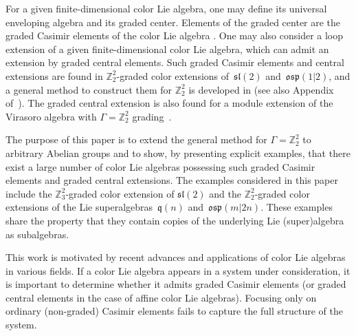 \documentclass[pdftex]{sigma}
\numberwithin{equation}{section}
\theoremstyle{definition}
\def\Z2{\mathbb{Z}_2^2}
\def\osp{\mathfrak{osp}}
\def\sl{\mathfrak{sl}}
\def\q{\mathfrak{q}}
\begin{document}
For a given finite-dimensional color Lie algebra, one may define its universal enveloping algebra and its graded center.
Elements of the graded center are the graded Casimir elements of the color Lie algebra \cite{GrJav, scheu,scheuCasi,scheuTen}.
One may also consider a loop extension of a given finite-dimensional color Lie algebra, which can admit an extension by graded central elements.
Such graded Casimir elements and central extensions are found in $\Z2$-graded color extensions of~$\sl(2)$ and~$\osp(1|2)$, and a general method to construct them for $\Z2$ is developed in \cite{AFITTsuper, AIKTTslint} (see also Appendix of~\cite{AiKimura}).
The graded central extension is also found for a module extension of the Virasoro algebra with $\Gamma = \Z2$ grading~\cite{AizawaConfType}.

The purpose of this paper is to extend the general method for $\Gamma = \Z2$ to arbitrary Abelian groups and to show, by presenting explicit examples, that there exist a large number of color Lie algebras possessing such graded Casimir elements and graded central extensions.
The examples considered in this paper include the $\mathbb{Z}_3^2$-graded color extension of $\sl(2)$ and the $\Z2$-graded color extensions of the Lie superalgebras~$\q(n)$ and~$\osp(m|2n)$. These examples share the property that they contain copies of the underlying Lie (super)algebra as subalgebras.

This work is motivated by recent advances and applications of color Lie algebras in various fields.
If a color Lie algebra appears in a system under consideration, it is important to determine whether it admits graded Casimir elements (or graded central elements in the case of affine color Lie algebras).
Focusing only on ordinary (non-graded) Casimir elements fails to capture the full structure of the system.
\end{document}

